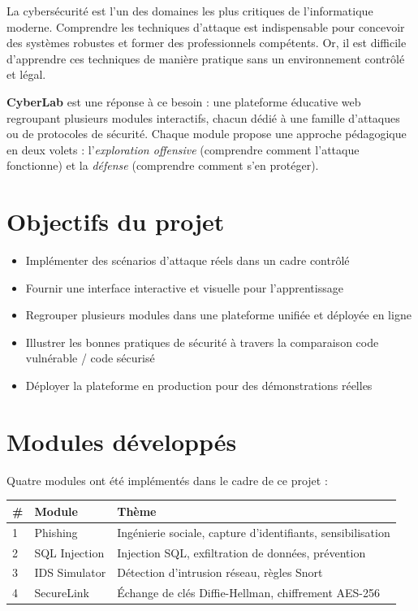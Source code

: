 \documentclass[12pt,a4paper]{report}
\newcommand{\keyword}[1]{\textbf{#1}}
\begin{document}
La cybersécurité est l'un des domaines les plus critiques de l'informatique
moderne. Comprendre les techniques d'attaque est indispensable pour concevoir
des systèmes robustes et former des professionnels compétents. Or, il est
difficile d'apprendre ces techniques de manière pratique sans un environnement
contrôlé et légal.

\keyword{CyberLab} est une réponse à ce besoin : une plateforme éducative
web regroupant plusieurs modules interactifs, chacun dédié à une famille
d'attaques ou de protocoles de sécurité. Chaque module propose une approche
pédagogique en deux volets : l'\textit{exploration offensive} (comprendre
comment l'attaque fonctionne) et la \textit{défense} (comprendre comment
s'en protéger).

\section{Objectifs du projet}

\begin{itemize}
  \item Implémenter des scénarios d'attaque réels dans un cadre contrôlé
  \item Fournir une interface interactive et visuelle pour l'apprentissage
  \item Regrouper plusieurs modules dans une plateforme unifiée et déployée en ligne
  \item Illustrer les bonnes pratiques de sécurité à travers la comparaison
        code vulnérable / code sécurisé
  \item Déployer la plateforme en production pour des démonstrations réelles
\end{itemize}

\section{Modules développés}

Quatre modules ont été implémentés dans le cadre de ce projet :

\begin{center}
\begin{tabular}{C{1.2cm} L{3.5cm} L{7.5cm}}
  \toprule
  \textbf{\#} & \textbf{Module} & \textbf{Thème} \\
   & Phishing        & Ingénierie sociale, capture d'identifiants, sensibilisation \\
  2 & SQL Injection   & Injection SQL, exfiltration de données, prévention \\
  3 & IDS Simulator   & Détection d'intrusion réseau, règles Snort \\
  4 & SecureLink      & Échange de clés Diffie-Hellman, chiffrement AES-256 \\
  \bottomrule
\end{tabular}
\end{center}
\end{document}
